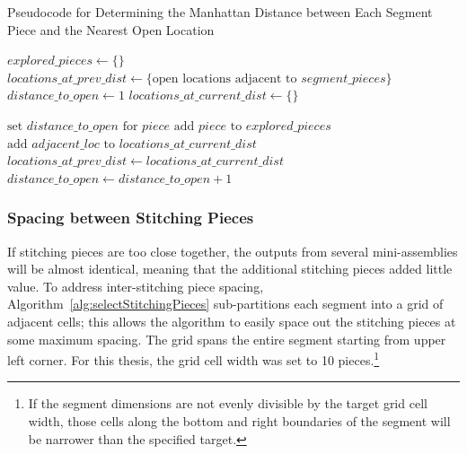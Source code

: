 \begin{algorithm}[tb]
\caption{Pseudocode for Determining the Manhattan Distance between Each Segment Piece and the Nearest Open Location}\label{alg:findDistanceToOpen}
\begin{algorithmic}[1]
    \State $explored\_pieces \gets \{ \}$
    \State $locations\_at\_prev\_dist \gets \{ \text{open locations adjacent to } segment\_pieces \}$
    \State $distance\_to\_open \gets 1$
     \label{op:distanceRoundWhileLoop}
        \State $locations\_at\_current\_dist \gets \{ \}$
        		
        			\State $\text{set } distance\_to\_open \text{ for } piece$
        			\State $\text{add } piece \text{ to } explored\_pieces$
        			\State $\text{add } adjacent\_loc \text{ to } locations\_at\_current\_dist$
        		\EndIf
        	\EndFor
        \EndFor
    \State $locations\_at\_prev\_dist \gets locations\_at\_current\_dist$
    \State $distance\_to\_open \gets distance\_to\_open + 1$
    \EndWhile
\EndProcedure
\end{algorithmic}
\end{algorithm}


\subsubsection{Spacing between Stitching Pieces}\label{sec:spacingBetweenStitchingPieces}

If stitching pieces are too close together, the outputs from several mini-assemblies will be almost identical, meaning that the additional stitching pieces added little value.  To address inter-stitching piece spacing, Algorithm~\ref{alg:selectStitchingPieces} sub-partitions each segment into a grid of adjacent cells; this allows the algorithm to easily space out the stitching pieces at some maximum spacing.  The grid spans the entire segment starting from upper left corner.  For this thesis, the grid cell width was set to 10 pieces.\footnote{If the segment dimensions are not evenly divisible by the target grid cell width, those cells along the bottom and right boundaries of the segment will be narrower than the specified target.} 

